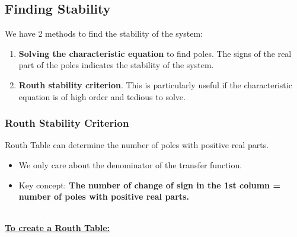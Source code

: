 \documentclass[12pt,a4paper]{article}
\begin{document}
\subsection{Finding Stability}
We have 2 methods to find the stability of the system:
\begin{enumerate}
\item \textbf{Solving the characteristic equation} to find poles. The signs of the real part of the poles indicates the stability of the system.
\item \textbf{Routh stability criterion}. This is particularly useful if the characteristic equation is of high order and tedious to solve.
\end{enumerate}

 \subsubsection{Routh Stability Criterion}
Routh Table can determine the number of poles with positive real parts.
\begin{itemize}
\item We only care about the denominator of the transfer function. 
\item Key concept: \textbf{The number of change of sign in the 1st column  = number of poles with positive real parts.}
\end{itemize}
\ \\
\underline{\textbf{To create a Routh Table:}}
\end{document}
